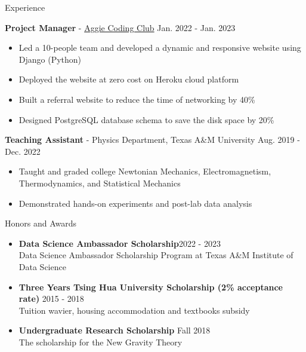 \documentclass{resume}
\begin{document}
\begin{rSection}{Experience}
    \item \textbf{Project Manager} - \href{https://aggiecodingclub.com}{Aggie Coding Club} \hfill Jan. 2022 - Jan. 2023
        \begin{itemize}
        \item Led a 10-people team and developed a dynamic and responsive website using Django (Python)
        \item Deployed the website at zero cost on Heroku cloud platform
        \item Built a referral website to reduce the time of networking by 40\%
        \item Designed PostgreSQL database schema to save the disk space by 20\%
        \end{itemize}

    \item \textbf{Teaching Assistant} - Physics Department, Texas A\&M University \hfill Aug. 2019 - Dec. 2022
        \begin{itemize}
        \item Taught and graded college Newtonian Mechanics, Electromagnetism, Thermodynamics, and Statistical Mechanics
        \item Demonstrated hands-on experiments and post-lab data analysis
        \end{itemize}
\end{rSection}


\vspace{-0.5em}
\begin{rSection}{Honors and Awards}
    \begin{itemize}
        \item \textbf{Data Science Ambassador Scholarship}\hfill 2022 - 2023\\
        Data Science Ambassador Scholarship Program at Texas A\&M Institute of Data Science
        \item \textbf{Three Years Tsing Hua University Scholarship (2\% acceptance rate)} \hfill 2015 - 2018 \\
        Tuition wavier, housing accommodation and textbooks subsidy
        \item \textbf{Undergraduate Research Scholarship} \hfill Fall 2018 \\
        The scholarship for the New Gravity Theory
    \end{itemize}
\end{rSection}
\end{document}
